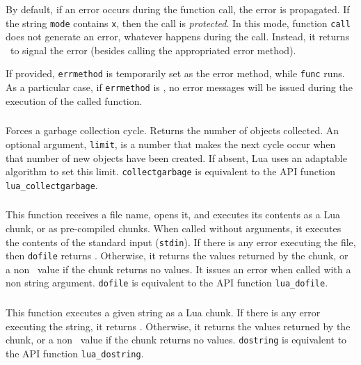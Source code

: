 By default,
if an error occurs during the function call,
the error is propagated.
If the string \verb|mode| contains \verb|x|,
then the call is \emph{protected}.
In this mode, function \verb|call| does not generate an error,
whatever happens during the call.
Instead, it returns \nil\ to signal the error
(besides calling the appropriated error method).

If provided, \verb|errmethod| is temporarily set as the error method,
while \verb|func| runs.
As a particular case, if \verb|errmethod| is \nil,
no error messages will be issued during the execution of the called function.

\subsubsection*{\ff {}}
Forces a garbage collection cycle.
Returns the number of objects collected.
An optional argument, \verb|limit|, is a number that
makes the next cycle occur when that number of new
objects have been created.
If absent, Lua uses an adaptable algorithm to set
this limit.
\verb|collectgarbage| is equivalent to
the API function \verb|lua_collectgarbage|.

\subsubsection*{\ff {}}
This function receives a file name,
opens it, and executes its contents as a Lua chunk,
or as pre-compiled chunks.
When called without arguments,
it executes the contents of the standard input (\verb|stdin|).
If there is any error executing the file,
then \verb|dofile| returns \nil.
Otherwise, it returns the values returned by the chunk,
or a non \nil\ value if the chunk returns no values.
It issues an error when called with a non string argument.
\verb|dofile| is equivalent to the API function \verb|lua_dofile|.

\subsubsection*{\ff {}}
This function executes a given string as a Lua chunk.
If there is any error executing the string, it returns \nil.
Otherwise, it returns the values returned by the chunk,
or a non \nil\ value if the chunk returns no values.
\verb|dostring| is equivalent to the API function \verb|lua_dostring|.


